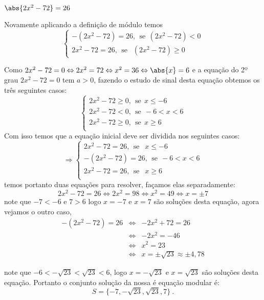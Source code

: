  \begin{exem}
  $\abs{2x^2 - 72}= 26$

  Novamente aplicando a definição de módulo temos
    \[
    \begin{cases}
      -(2x^2-72)= 26, \ \ \text{se} \ \ (2x^2-72)<0 \\
      2x^2- 72= 26, \ \ \text{se } \ \ (2x^2-72) \geq 0
     \end{cases}
     \]

     Como $2x^2- 72= 0 \Leftrightarrow 2x^2= 72 \Leftrightarrow x^2= 36 \Leftrightarrow \abs{x}= 6$ e a equação do 2º grau $2x^2- 72= 0$ tem $a> 0$, fazendo o estudo de sinal desta equação obtemos os três seguintes casos:
     \[
     \begin{cases}
      2x^2- 72 \geq 0, \ \ \text{se} \ \ x \leq -6 \\
      2x^2- 72 < 0, \ \ \text{se} \ \ -6 < x < 6 \\
      2x^2- 72 \geq 0, \ \ \text{se} \ \ x \geq 6 \\
     \end{cases}
     \]
     Com isso temos que a equação inicial deve ser dividida nos seguintes casos:
     \[
     \Rightarrow
      \begin{cases}
       2x^2- 72= 26, \ \ \text{se } \ \ x \leq -6 \\
      -(2x^2-72)= 26, \ \ \text{se} \ \ -6 < x < 6\\
       2x^2- 72= 26, \ \ \text{se } \ \ x \geq 6 \\
     \end{cases}
     \]
     temos portanto duas equações para resolver, façamos elas separadamente:
\begin{equation}
2x^2- 72= 26 \Leftrightarrow 2x^2= 98 \Leftrightarrow x^2= 49 \Leftrightarrow x= \pm 7
\end{equation}
     note que $-7 < -6$ e $7 > 6$ logo $x=-7$ e $x=7$ são soluções desta equação, agora vejamos o outro caso,
      \begin{eqnarray}
      -(2x^2-72)= 26 & \Leftrightarrow & -2x^2 + 72= 26\\
      & \Leftrightarrow & -2x^2= -46 \\
      & \Leftrightarrow & x^2= 23 \\
      & \Leftrightarrow & x= \pm \sqrt{23} \approx \pm 4,78
      \end{eqnarray}

note que $-6< -\sqrt{23} < \sqrt{23} < 6$, logo $x=-\sqrt{23}$ e $x=\sqrt{23}$ são soluções desta equação. Portanto o conjunto solução da nossa é equação modular é:
\begin{equation}
S= \{-7, -\sqrt{23}, \sqrt{23}, 7\} \ .
\end{equation}
\end{exem}

